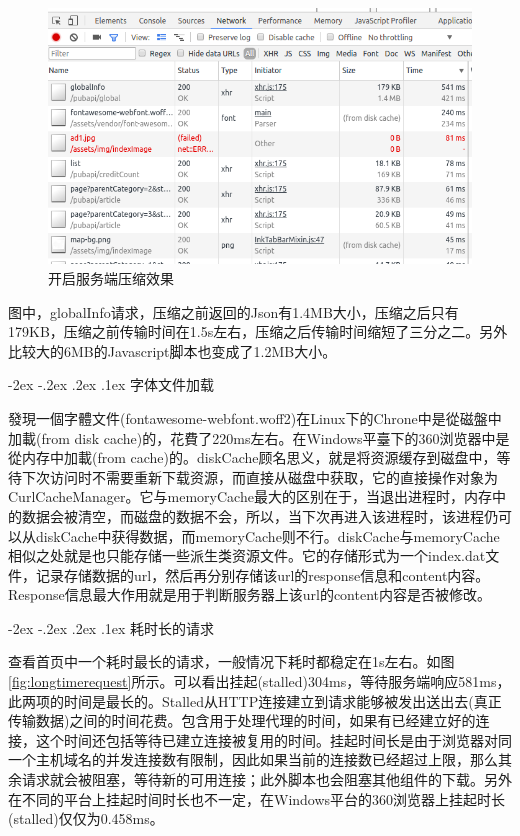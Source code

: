 \documentclass[12pt]{book}
\makeatletter
\numberwithin{dummy}{section}
\theoremstyle{ocrenumbox}
\theoremstyle{blacknumex}
\theoremstyle{blacknumbox}
\theoremstyle{ocrenum}
\renewcommand\paragraph{\@startsection{paragraph}{4}{\z@}
	{-2ex \@plus-.2ex \@minus .2ex}
	{.1ex}
	{\normalfont\small\sffamily\bfseries}}
\newlength\esp
\makeatother
\begin{document}
\begin{figure}[htbp]
	\centering
	\includegraphics[scale=0.5]{openservercompress.png}
	\caption{开启服务端压缩效果}
	\label{fig:openservercompress}
\end{figure}

图中，globalInfo请求，压缩之前返回的Json有1.4MB大小，压缩之后只有179KB，压缩之前传输时间在1.5s左右，压缩之后传输时间缩短了三分之二。另外比较大的6MB的Javascript脚本也变成了1.2MB大小。

\paragraph{字体文件加载}

發現一個字體文件(fontawesome-webfont.woff2)在Linux下的Chrone中是從磁盤中加載(from disk cache)的，花費了220ms左右。在Windows平臺下的360浏览器中是從内存中加載(from cache)的。diskCache顾名思义，就是将资源缓存到磁盘中，等待下次访问时不需要重新下载资源，而直接从磁盘中获取，它的直接操作对象为CurlCacheManager。它与memoryCache最大的区别在于，当退出进程时，内存中的数据会被清空，而磁盘的数据不会，所以，当下次再进入该进程时，该进程仍可以从diskCache中获得数据，而memoryCache则不行。diskCache与memoryCache相似之处就是也只能存储一些派生类资源文件。它的存储形式为一个index.dat文件，记录存储数据的url，然后再分别存储该url的response信息和content内容。Response信息最大作用就是用于判断服务器上该url的content内容是否被修改。

\paragraph{耗时长的请求}

查看首页中一个耗时最长的请求，一般情况下耗时都稳定在1s左右。如图\ref{fig:longtimerequest}所示。可以看出挂起(stalled)304ms，等待服务端响应581ms，此两项的时间是最长的。Stalled从HTTP连接建立到请求能够被发出送出去(真正传输数据)之间的时间花费。包含用于处理代理的时间，如果有已经建立好的连接，这个时间还包括等待已建立连接被复用的时间。挂起时间长是由于浏览器对同一个主机域名的并发连接数有限制，因此如果当前的连接数已经超过上限，那么其余请求就会被阻塞，等待新的可用连接；此外脚本也会阻塞其他组件的下载。另外在不同的平台上挂起时间时长也不一定，在Windows平台的360浏览器上挂起时长(stalled)仅仅为0.458ms。
\end{document}
